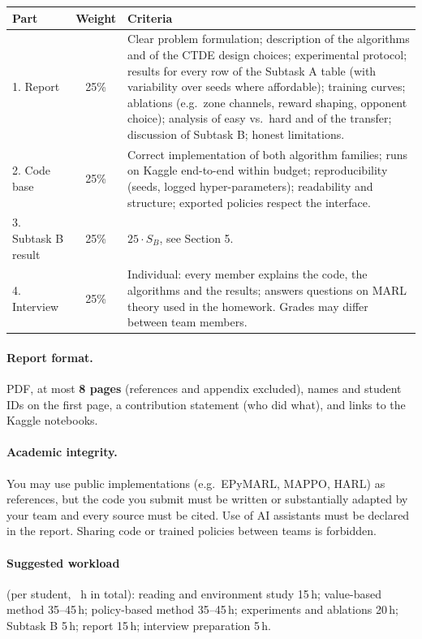 \documentclass[11pt,a4paper]{article}
\begin{document}
\begin{table}[H]
\centering
\begin{tabularx}{\linewidth}{@{}l c X@{}}
\toprule
\textbf{Part} & \textbf{Weight} & \textbf{Criteria} \\
\midrule
1. Report & 25\% & Clear problem formulation; description of the algorithms and of the
CTDE design choices; experimental protocol; results for every row of the Subtask A table
(with variability over seeds where affordable); training curves; ablations (e.g.\ zone
channels, reward shaping, opponent choice); analysis of easy vs.\ hard and of the transfer;
discussion of Subtask B; honest limitations. \\
2. Code base & 25\% & Correct implementation of both algorithm families; runs on Kaggle
end-to-end within budget; reproducibility (seeds, logged hyper-parameters); readability and
structure; exported policies respect the interface. \\
3. Subtask B result & 25\% & $25\cdot S_B$, see Section 5. \\
4. Interview & 25\% & Individual: every member explains the code, the algorithms and the
results; answers questions on MARL theory used in the homework.  Grades may differ between
team members. \\
\bottomrule
\end{tabularx}
\end{table}

\paragraph{Report format.}
PDF, at most \textbf{8 pages} (references and appendix excluded), names and student IDs on
the first page, a contribution statement (who did what), and links to the Kaggle notebooks.

\paragraph{Academic integrity.}
You may use public implementations (e.g.\ EPyMARL, MAPPO, HARL) as references, but the
code you submit must be written or substantially adapted by your team and every source
must be cited.  Use of AI assistants must be declared in the report.  Sharing code or
trained policies between teams is forbidden.

\paragraph{Suggested workload} (per student, \Workload\ h in total):
reading and environment study 15\,h; value-based method 35--45\,h; policy-based method
35--45\,h; experiments and ablations 20\,h; Subtask B 5\,h; report 15\,h; interview
preparation 5\,h.
\end{document}
